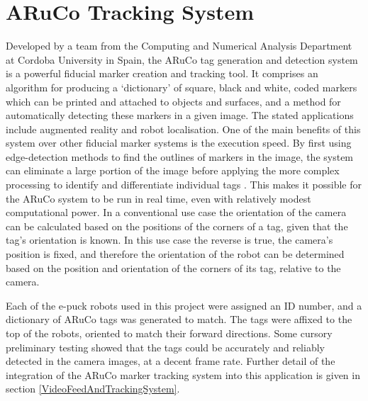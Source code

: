 
\section{ARuCo Tracking System} \label{ARuCo}
Developed by a team from the Computing and Numerical Analysis Department at Cordoba University in Spain, the ARuCo tag generation and detection system \cite{Garrido:2014} is a powerful fiducial marker creation and tracking tool. It comprises an algorithm for producing a `dictionary' of square, black and white, coded markers which can be printed and attached to objects and surfaces, and a method for automatically detecting these markers in a given image. The stated applications include augmented reality and robot localisation. One of the main benefits of this system over other fiducial marker systems is the execution speed. By first using edge-detection methods to find the outlines of markers in the image, the system can eliminate a large portion of the image before applying the more complex processing to identify and differentiate individual tags \cite{Garrido:2014}. This makes it possible for the ARuCo system to be run in real time, even with relatively modest computational power. In a conventional use case the orientation of the camera can be calculated based on the positions of the corners of a tag, given that the tag's orientation is known. In this use case the reverse is true, the camera's position is fixed, and therefore the orientation of the robot can be determined based on the position and orientation of the corners of its tag, relative to the camera. 

Each of the e-puck robots used in this project were assigned an ID number, and a dictionary of ARuCo tags was generated to match. The tags were affixed to the top of the robots, oriented to match their forward directions. Some cursory preliminary testing showed that the tags could be accurately and reliably detected in the camera images, at a decent frame rate. Further detail of the integration of the ARuCo marker tracking system into this application is given in section \ref{VideoFeedAndTrackingSystem}.

